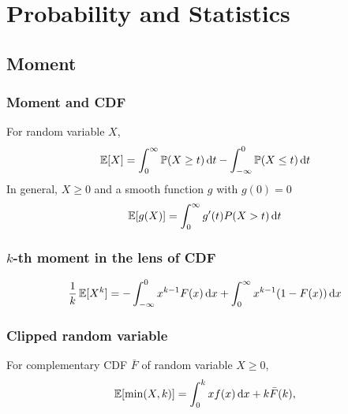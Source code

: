 \documentclass[10pt]{article}
\begin{document}
\section{Probability and Statistics}
\subsection{Moment}
\subsubsection{Moment and CDF}
For random variable $X$, 
\begin{equation}
    \mathop{\mathbb{E} \displaystyle} [X] = \int_0^{\infty} \mathbb{P} (X \geq t) \,\mathrm{d}t - \int_{-\infty}^0 \mathbb{P}(X \leq t) \,\mathrm{d}t 
\end{equation}
In general, $X \geq 0$ and a smooth function $g$ with $g(0) = 0 $  
\begin{equation}
    \mathop{\mathbb{E} \displaystyle} [g(X)] =\int_0^{\infty} g^{\prime} (t) P(X >t) \,\mathrm{d}t  
\end{equation}
\subsubsection[alternative]{$k$-th moment in the lens of CDF}
\begin{equation}
    \frac{1}{k} \mathop{\mathbb{E} \displaystyle}[X^k] = - \int_{-\infty}^0 x^{k-1} F(x) \,\mathrm{d}x + \int_0^{\infty} x^{k-1} (1- F(x)) \,\mathrm{d}x 
\end{equation}
\subsubsection{Clipped random variable}
For complementary CDF $\bar{F}$ of random variable $X \geq 0$, 
\begin{equation}
    \mathop{\mathbb{E} \displaystyle}[\min(X,k)] = \int_0^k x f(x) \,\mathrm{d}x + k \bar{F} (k), 
\end{equation}
\end{document}
